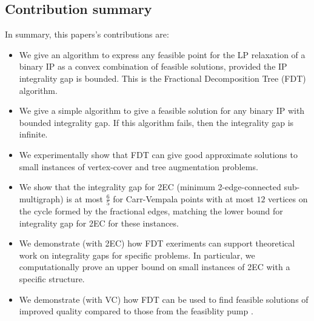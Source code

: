\subsection{Contribution summary}
In summary, this papers's contributions are:
\begin{itemize}
\item We give an algorithm to express any feasible point for the LP relaxation of a binary IP
as a convex combination of feasible solutions, provided the IP integrality gap is bounded.  This is the Fractional Decomposition Tree (FDT) algorithm.
\item We give a simple  algorithm to give a feasible solution for any binary IP with bounded integrality gap. If this algorithm fails, then the integrality gap is infinite.
\item We experimentally show that FDT can give good approximate solutions to small instances of vertex-cover and tree augmentation problems.
\item We show that the integrality gap for 2EC (minimum 2-edge-connected sub-multigraph) is at most $\frac{6}{5}$ for Carr-Vempala points with at most $12$ vertices on the cycle formed by the fractional edges, matching the lower bound for integrality gap for 2EC for these instances.
\item We demonstrate (with 2EC) how FDT exeriments can support theoretical work on integrality gaps for specific problems. In particular, we computationally prove an upper bound on small instances of 2EC with a specific structure.
\item We demonstrate (with VC) how FDT can be used to find feasible solutions of improved quality compared to those from the feasiblity pump \cite{fp1}.
\end{itemize}


